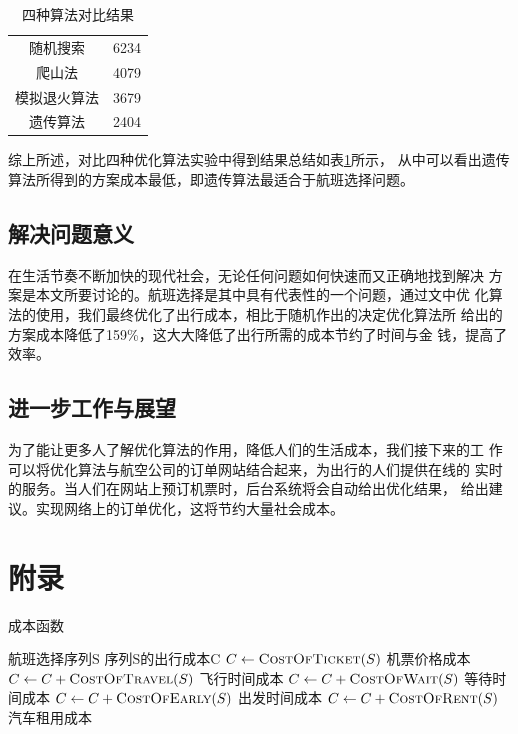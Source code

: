 \documentclass[fontset=fandol,a4paper,zihao=5]{ctexart}
\begin{document}
			
			\begin{table}[!htbp]
				\centering
				\caption{四种算法对比结果}
				\label{tab:cmp}
				\begin{tabular}{cc}
					\toprule[1pt]
					\makebox[0.3\textwidth]{算法} & \makebox[0.3\textwidth]{方案成本} \\
					\midrule
					随机搜索 		& 6234 \\
					爬山法			 &  4079 \\
					模拟退火算法	   & 3679 \\
					遗传算法		&  2404 \\
					\bottomrule[1pt]
				\end{tabular} 
			\end{table}
		
			综上所述，对比四种优化算法实验中得到结果总结如表\ref{tab:cmp}所示，
            从中可以看出遗传算法所得到的方案成本最低，即遗传算法最适合于航班选择问题。
		\subsection{解决问题意义}
			在生活节奏不断加快的现代社会，无论任何问题如何快速而又正确地找到解决
            方案是本文所要讨论的。航班选择是其中具有代表性的一个问题，通过文中优
            化算法的使用，我们最终优化了出行成本，相比于随机作出的决定优化算法所
            给出的方案成本降低了159\%，这大大降低了出行所需的成本节约了时间与金
            钱，提高了效率。
		\subsection{进一步工作与展望}
			为了能让更多人了解优化算法的作用，降低人们的生活成本，我们接下来的工
            作可以将优化算法与航空公司的订单网站结合起来，为出行的人们提供在线的
            实时的服务。当人们在网站上预订机票时，后台系统将会自动给出优化结果，
            给出建议。实现网络上的订单优化，这将节约大量社会成本。
	\newpage
    \section{附录}
			\begin{algorithm}
                \begin{algorithmic}
					\caption{\label{alg:evaluation}成本函数}
					\Require $\text{航班选择序列S}$
					\Ensure $\text{序列S的出行成本C}$
					\State $C \gets \Call {CostOfTicket}{S}$ \Comment 机票价格成本
					\State $C \gets C + \Call {CostOfTravel} {S}$ \Comment 飞行时间成本
					\State $C \gets C + \Call {CostOfWait} {S}$ \Comment 等待时间成本
					\State $C \gets C + \Call {CostOfEarly} {S}$ \Comment 出发时间成本
					\State $C \gets C + \Call {CostOfRent} {S}$ \Comment 汽车租用成本
					\State {}
					\EndFunction
                \end{algorithmic}
			\end{algorithm}
\end{document}
